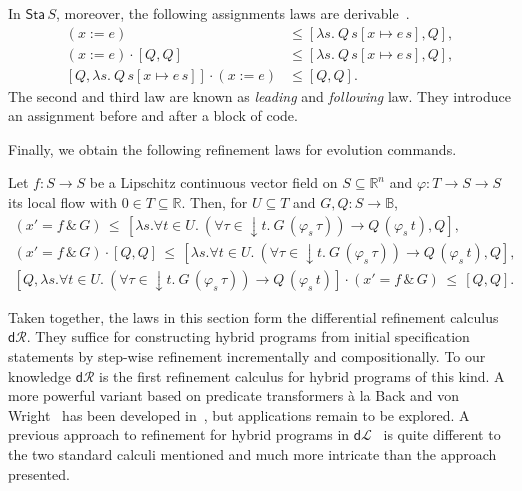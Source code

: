 \documentclass[envcountsame]{llncs}
\newcommand{\dL}{\mathsf{d}\mathcal{L}}
\newcommand{\dR}{\mathsf{d}\mathcal{R}}
\newcommand{\flow}{\varphi}
\newcommand{\reals}{\mathbb{R}}
\newcommand{\bools}{\mathbb{B}}
\newcommand{\sta}{\mathsf{Sta}}
\begin{document}
In $\sta\, S$, moreover, the following assignments laws are
derivable~\cite{ArmstrongGS16}.
\begin{align}
 (x := e)  &\le  \left[\lambda s.\ Q\, s[x\mapsto e\, s],Q\right],\label{eq:r-assgn}\tag{r-assgn}\\
(x:= e) \cdot \left[Q,Q\right] &\le [\lambda s.\ Q\, s[x\mapsto e\, s],Q],\label{eq:r-assgn}\tag{r-assgnl}\\
\left[Q,\lambda s.\ Q\, s[x\mapsto e\, s]\right]\cdot (x:=e) &\le [Q,Q]. \label{eq:r-assgn}\tag{r-assgnf}
\end{align}
The second and third law are known as \emph{leading} and \emph{following}
law. They introduce an assignment before and after a block of code. 

Finally, we obtain the following refinement laws for evolution
commands.
\begin{lemma}\label{P:r-evl-lemma}
  Let $f:S\to S$ be a Lipschitz continuous vector field on
  $S\subseteq \reals^n$ and $\flow:T\to S\to S$ its local flow with
  $0\in T\subseteq \reals$. Then, for $U\subseteq T$ and
  $G,Q:S\to\bools$,
\begin{gather*}
(x' = f\, \&\, G)\, \le\, [\lambda s.\forall t\in U.\ (\forall
\tau\in {\downarrow}t.\ G\, (\flow_s\, \tau))\to Q\, (\flow_s\, t),Q],\label{eq:r-evl}\tag{r-evl}\\
(x' = f\, \&\, G) \cdot \left[Q,Q\right]\, \le\, [\lambda s. \forall t\in U.\ (\forall
\tau\in {\downarrow}t.\ G\, (\flow_s\, \tau))\to Q\, (\flow_s\, t),Q],\label{eq:r-evll}\tag{r-evll}\\
\left[Q,\lambda s. \forall t\in U.\ (\forall
\tau\in {\downarrow}t.\ G\, (\flow_s\, \tau))\to Q\, (\flow_s\,
t)\right]\cdot (x' = f\, \&\, G) \, \le \, [Q,Q].\label{eq:r-evlr}\tag{r-evlr}
\end{gather*}
\end{lemma}

Taken together, the laws in this section form the differential
refinement calculus $\dR$.  They suffice for constructing hybrid
programs from initial specification statements by step-wise refinement
incrementally and compositionally. To our knowledge $\dR$ is the first
refinement calculus for hybrid programs of this kind.  A more powerful
variant based on predicate transformers \`a la Back and von
Wright~\cite{BackW98} has been developed in~\cite{MuniveS19}, but
applications remain to be explored.  A previous approach to refinement
for hybrid programs in $\dL$~\cite{LoosP16} is quite different to the
two standard calculi mentioned and much more intricate than the
approach presented.
\end{document}
